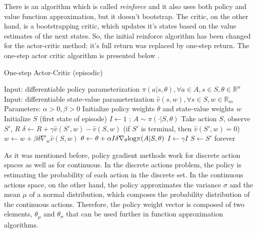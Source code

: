 There is an algorithm which is called \textit{reinforce} and it also uses both policy and value function approximation, but it doesn't bootstrap. The critic, on the other hand, is a bootstrapping critic, which updates it's states based on the value estimates of the next states. So, the initial reinforce algorithm has been changed for the actor-critic method: it's full return was replaced by one-step return. The one-step actor critic algorithm is presented below \cite{Sutton}.
\begin{algorithm}[H]
\caption{One-step Actor-Critic (episodic)}
\label{algo:AC}
\begin{algorithmic}
\State Input: differentiable policy parameterization $\pi(a|s,\theta),\forall a\in A, s\in S,\theta\in\mathbb{R}^{n}$
\State Input: differentiable state-value parameterization $\hat{v}(s,w),\forall s \in S, w \in \mathbb{R}_{m}$
\State Parameters: $\alpha>0,\beta>0$
\State Initialize policy weights $\theta$ and state-value weights $w$
\Repeat
\State Initialize $S$ (first state of episode)
\State $I\leftarrow 1$
:
\State $A\sim \pi(\cdot|S,\theta)$
\State Take action $S$, observe $S'$, $R$
\State $\delta\leftarrow R+\gamma\hat{v}(S',w)-\hat{v}(S,w)$ (if $S'$ is terminal, then $\hat{v}(S',w)=0$)
\State $w\leftarrow w+\beta\delta\nabla_{w}\hat{v}(S,w)$
\State $\theta\leftarrow \theta+\alpha I \delta\nabla_{\theta} \textup{log} \pi(A|S,\theta)$
\State $I\leftarrow \gamma I$
\State $S\leftarrow S'$
\EndWhile
\Until forever
\end{algorithmic}
\end{algorithm}

As it was mentioned before, policy gradient methods work for discrete action spaces as well as for continuous. In the discrete actions problem, the policy is estimating the probability of each action in the discrete set. In the continuous actions space, on the other hand, the policy approximates the variance $\sigma$ and the mean $\mu$ of a normal distribution, which composes the probability distribution of the continuous actions. Therefore, the policy weight vector is composed of two elements, $\theta_{\mu}$ and $\theta_{\sigma}$ that can be used further in function approximation algorithms.